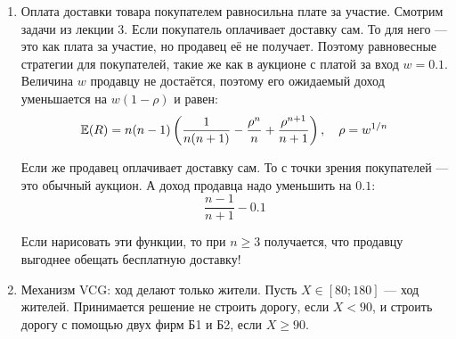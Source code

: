 \begin{enumerate}
\begin{figure}
\hfill
{}
\hfill
{}
\hfill
\end{figure}

\item Оплата доставки товара покупателем равносильна плате за участие. Смотрим задачи из лекции 3. Если покупатель оплачивает доставку сам. То для него — это как плата за участие, но продавец её не получает. Поэтому равновесные стратегии для покупателей, такие же как в аукционе с платой за вход $ w=0.1 $. Величина $ w $ продавцу не достаётся, поэтому его ожидаемый доход уменьшается на $ w(1-\rho) $ и равен:
\begin{equation}
\mathbb{E}(R)=n(n-1)\left(\frac{1}{n(n+1)}-\frac{\rho^{n}}{n}+\frac{\rho^{n+1}}{n+1}\right),\quad \rho=w^{1/n}
\end{equation}


Если же продавец оплачивает доставку сам. То с точки зрения покупателей — это обычный аукцион. А доход продавца надо уменьшить на $ 0.1 $:
\begin{equation}
\frac{n-1}{n+1}-0.1
\end{equation}

Если нарисовать эти функции, то при $ n\geq 3 $ получается, что продавцу выгоднее обещать бесплатную доставку!

\item Механизм VCG: ход делают только жители. Пусть $ X\in[80;180]$ — ход жителей. Принимается решение не строить дорогу, если $ X<90 $, и строить дорогу с помощью двух фирм Б1 и Б2, если $ X\geq 90 $.


\end{enumerate}
